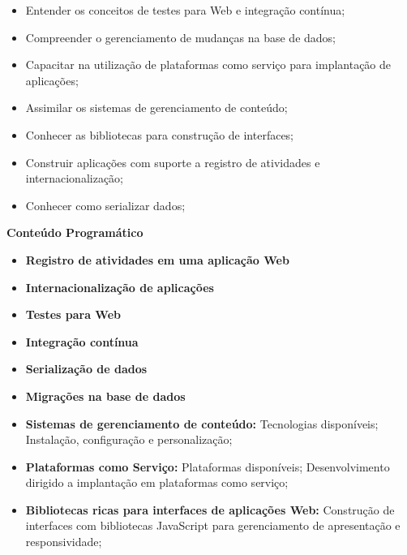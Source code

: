 \begin{itemize}

\item Entender os conceitos de testes para Web e integração contínua;

\item Compreender o gerenciamento de mudanças na base de dados;

\item Capacitar na utilização de plataformas como serviço para implantação de aplicações;

\item Assimilar os sistemas de gerenciamento de conteúdo;

\item Conhecer as bibliotecas para construção de interfaces;

\item Construir aplicações com suporte a registro de atividades e internacionalização;

\item Conhecer como serializar dados;

\end{itemize} 


\begin{snugshade}\begin{center}\textbf{
    Conteúdo Programático
}\end{center}\end{snugshade}

\begin{itemize}

\item \textbf{Registro de atividades em uma aplicação Web}
\item \textbf{Internacionalização de aplicações}
\item \textbf{Testes para Web}
\item \textbf{Integração contínua}
\item \textbf{Serialização de dados}
\item \textbf{Migrações na base de dados}
\item \textbf{Sistemas de gerenciamento de conteúdo:}
    Tecnologias disponíveis; Instalação, configuração e personalização;
\item \textbf{Plataformas como Serviço:}
    Plataformas disponíveis; Desenvolvimento dirigido a implantação em plataformas como serviço;
\item \textbf{Bibliotecas ricas para interfaces de aplicações Web:}
    Construção de interfaces com bibliotecas JavaScript para gerenciamento de apresentação e responsividade;

\end{itemize}

